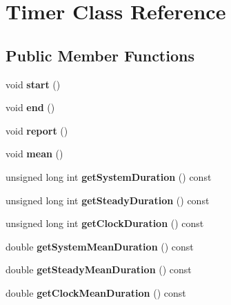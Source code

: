 \hypertarget{classTimer}{}\section{Timer Class Reference}
\label{classTimer}
\subsection*{Public Member Functions}
\begin{DoxyCompactItemize}
\item 
\mbox{\label{classTimer_a3a8b5272198d029779dc9302a54305a8}} 
void {\bfseries start} ()
\item 
\mbox{\label{classTimer_accef2f2b25869fbca2947a56b494d2a0}} 
void {\bfseries end} ()
\item 
\mbox{\label{classTimer_ab639c59072f1af668e8f0b01899fbed5}} 
void {\bfseries report} ()
\item 
\mbox{\label{classTimer_af28858556e8ac4c505468d1210a49d15}} 
void {\bfseries mean} ()
\item 
\mbox{\label{classTimer_a37f089d8b5970b158a6c5baf32af97ff}} 
unsigned long int {\bfseries get\+System\+Duration} () const
\item 
\mbox{\label{classTimer_ac0cd8e22bfc95867b338823070f92a15}} 
unsigned long int {\bfseries get\+Steady\+Duration} () const
\item 
\mbox{\label{classTimer_a4fc31127385ed78ebdffdca74a413031}} 
unsigned long int {\bfseries get\+Clock\+Duration} () const
\item 
\mbox{\label{classTimer_aab9798318623059d27f162f939ee05cc}} 
double {\bfseries get\+System\+Mean\+Duration} () const
\item 
\mbox{\label{classTimer_a07ab142e471658f501d819e5e2f79c51}} 
double {\bfseries get\+Steady\+Mean\+Duration} () const
\item 
\mbox{\label{classTimer_ab7138d14080899b72dff68a187e4b584}} 
double {\bfseries get\+Clock\+Mean\+Duration} () const

\end{DoxyCompactItemize}
